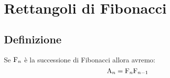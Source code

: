 \chapter{Rettangoli di Fibonacci}
\section{Definizione}
\begin{defn}

	Se $\mathrm{F}_{n}$ è la successione di Fibonacci allora avremo:
	\begin{equation}
		\mathrm{A}_{n}=\mathrm{F}_{n}\mathrm{F}_{n-1}
	\end{equation}	
\end{defn}